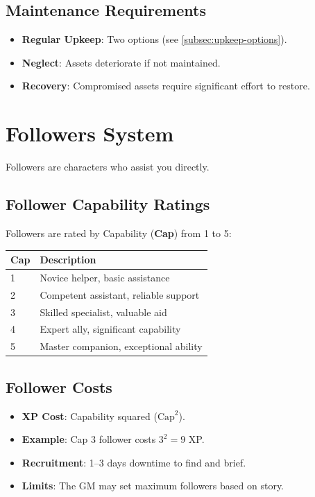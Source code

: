 \subsection*{Maintenance Requirements}
\label{sec:asset-maintenance}
\begin{itemize}
\item \textbf{Regular Upkeep}: Two options (see \ref{subsec:upkeep-options}).
\item \textbf{Neglect}: Assets deteriorate if not maintained.
\item \textbf{Recovery}: Compromised assets require significant effort to restore.
\end{itemize}

\section{Followers System}
\label{sec:followers-system}

Followers are characters who assist you directly.

\subsection*{Follower Capability Ratings}
\label{sec:follower-cap}
Followers are rated by Capability (\textbf{Cap}) from 1 to 5:

\begin{center}
\begin{tabular}{ll}
\toprule
\textbf{Cap} & \textbf{Description} \\
\midrule
1 & Novice helper, basic assistance \\
2 & Competent assistant, reliable support \\
3 & Skilled specialist, valuable aid \\
4 & Expert ally, significant capability \\
5 & Master companion, exceptional ability \\
\bottomrule
\end{tabular}
\end{center}

\subsection*{Follower Costs}
\label{sec:follower-costs}
\begin{itemize}
\item \textbf{XP Cost}: Capability squared ($\text{Cap}^2$).
\item \textbf{Example}: Cap 3 follower costs $3^2 = 9$ XP.
\item \textbf{Recruitment}: 1–3 days downtime to find and brief.
\item \textbf{Limits}: The GM may set maximum followers based on story.
\end{itemize}

